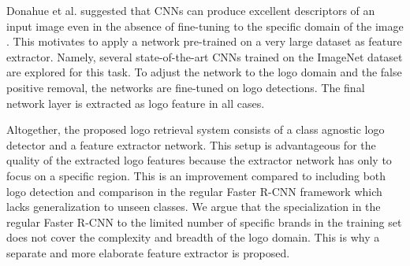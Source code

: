 \documentclass[a4paper,twoside]{article}
\begin{document}
Donahue et al. suggested that \acp{CNN} can produce excellent descriptors of an input image  even in the absence of fine-tuning to the specific domain of the image \cite{donahue2015}. 
This motivates to apply a network pre-trained on a very large dataset as feature extractor. Namely, several state-of-the-art \acp{CNN} trained on the ImageNet dataset \cite{deng2009} are explored for this task. To adjust the network to the logo domain and the false positive removal, the networks are fine-tuned on logo detections. The final network layer is extracted as logo feature in all cases.

Altogether, the proposed logo retrieval system consists of a class agnostic logo detector and a feature extractor network. This setup is advantageous for the quality of the extracted logo features because the extractor network has only to focus on a specific region.
This is an improvement compared to including both logo detection and comparison in the regular Faster R-CNN framework which lacks generalization to unseen classes. We argue that the specialization in the regular Faster R-CNN to the limited number of specific brands in the training set does not cover the complexity and breadth of the logo domain. This is why a separate and more elaborate feature extractor is proposed. %
\end{document}
